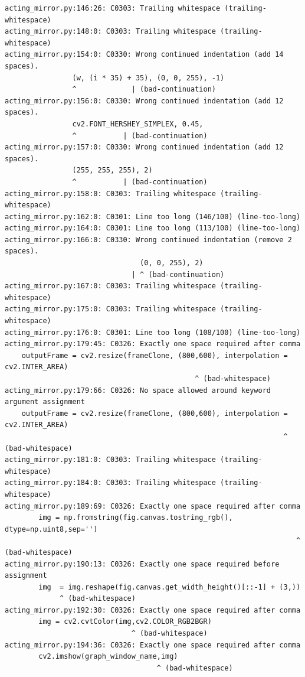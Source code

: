 \documentclass[runningheads,a4paper,11pt]{report}
\begin{document}
\begin{appendices}
\begin{lstlisting}
acting_mirror.py:146:26: C0303: Trailing whitespace (trailing-whitespace)
acting_mirror.py:148:0: C0303: Trailing whitespace (trailing-whitespace)
acting_mirror.py:154:0: C0330: Wrong continued indentation (add 14 spaces).
                (w, (i * 35) + 35), (0, 0, 255), -1)
                ^             | (bad-continuation)
acting_mirror.py:156:0: C0330: Wrong continued indentation (add 12 spaces).
                cv2.FONT_HERSHEY_SIMPLEX, 0.45,
                ^           | (bad-continuation)
acting_mirror.py:157:0: C0330: Wrong continued indentation (add 12 spaces).
                (255, 255, 255), 2)
                ^           | (bad-continuation)
acting_mirror.py:158:0: C0303: Trailing whitespace (trailing-whitespace)
acting_mirror.py:162:0: C0301: Line too long (146/100) (line-too-long)
acting_mirror.py:164:0: C0301: Line too long (113/100) (line-too-long)
acting_mirror.py:166:0: C0330: Wrong continued indentation (remove 2 spaces).
                                (0, 0, 255), 2)
                              | ^ (bad-continuation)
acting_mirror.py:167:0: C0303: Trailing whitespace (trailing-whitespace)
acting_mirror.py:175:0: C0303: Trailing whitespace (trailing-whitespace)
acting_mirror.py:176:0: C0301: Line too long (108/100) (line-too-long)
acting_mirror.py:179:45: C0326: Exactly one space required after comma
    outputFrame = cv2.resize(frameClone, (800,600), interpolation = cv2.INTER_AREA)
                                             ^ (bad-whitespace)
acting_mirror.py:179:66: C0326: No space allowed around keyword argument assignment
    outputFrame = cv2.resize(frameClone, (800,600), interpolation = cv2.INTER_AREA)
                                                                  ^ (bad-whitespace)
acting_mirror.py:181:0: C0303: Trailing whitespace (trailing-whitespace)
acting_mirror.py:184:0: C0303: Trailing whitespace (trailing-whitespace)
acting_mirror.py:189:69: C0326: Exactly one space required after comma
        img = np.fromstring(fig.canvas.tostring_rgb(), dtype=np.uint8,sep='')
                                                                     ^ (bad-whitespace)
acting_mirror.py:190:13: C0326: Exactly one space required before assignment
        img  = img.reshape(fig.canvas.get_width_height()[::-1] + (3,))
             ^ (bad-whitespace)
acting_mirror.py:192:30: C0326: Exactly one space required after comma
        img = cv2.cvtColor(img,cv2.COLOR_RGB2BGR)
                              ^ (bad-whitespace)
acting_mirror.py:194:36: C0326: Exactly one space required after comma
        cv2.imshow(graph_window_name,img)
                                    ^ (bad-whitespace)

\end{lstlisting}
\end{appendices}
\end{document}
